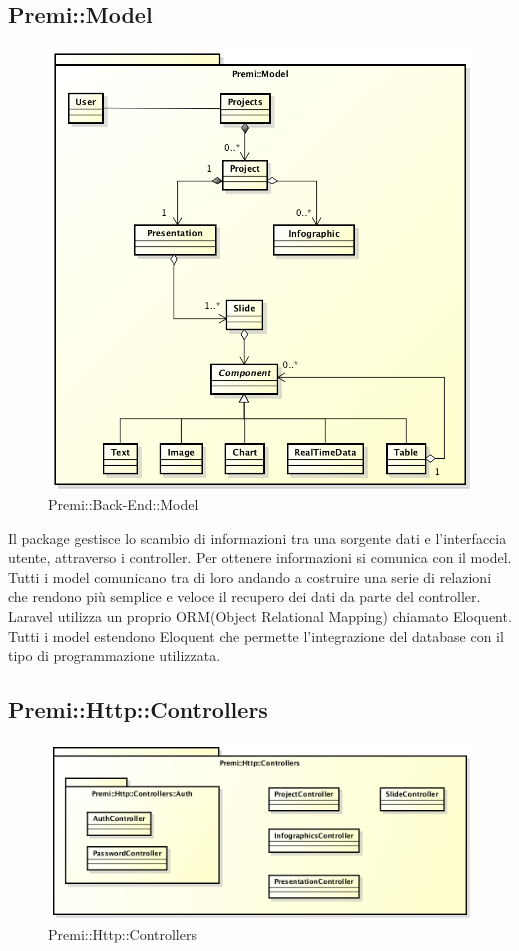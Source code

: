 \subsection{Premi::Model}
	\begin{figure}[h]
		\centering
		\includegraphics[width=0.7\linewidth]{img/premi_model}
		\caption[Premi::Back-End::Model]{Premi::Back-End::Model}
		\label{fig:back_end_premi_model}
	\end{figure}

	
Il package gestisce lo scambio di informazioni tra una sorgente dati e l'interfaccia utente, attraverso i controller. Per ottenere informazioni si comunica con il model. Tutti i model comunicano tra di loro andando a costruire una serie di relazioni che rendono più semplice e veloce il recupero dei dati da parte del controller. \gls{Laravel} utilizza un proprio \gls{ORM}(Object Relational Mapping) chiamato Eloquent. Tutti i model estendono Eloquent che permette l'integrazione del \gls{database} con il tipo di programmazione utilizzata.

\newpage



\newpage
\subsection{Premi::Http::Controllers}
	\begin{figure}[h]
		\centering
		\includegraphics[width=0.7\linewidth]{img/back_end_premi_http_controllers}
		\caption[Premi::Http::Controllers]{Premi::Http::Controllers}
		\label{fig:back_end_premi_http_controllers}
	\end{figure}

